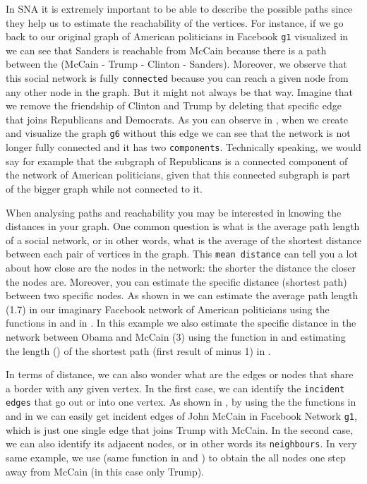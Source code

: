 In SNA it is extremely important to be able to describe the possible paths since they help us to estimate the reachability of the vertices. For instance, if we go back to our original graph of American politicians in Facebook \texttt{g1} visualized in  we can see that Sanders is reachable from McCain because there is a path between the (McCain - Trump - Clinton - Sanders).  Moreover, we observe that this social network is fully \texttt{connected} because you can reach a given node from any other node in the graph. But it might not always be that way. Imagine that we remove the friendship of Clinton and Trump by deleting that specific edge that joins Republicans and Democrats. As you can observe in , when we create and visualize the graph \texttt{g6} without this edge we can see that the network is not longer fully connected and it has two \texttt{components}. Technically speaking, we would say for example that the subgraph of Republicans is a connected component of the network of American politicians, given that this connected subgraph is part of the bigger graph while not connected to it.


When analysing paths and reachability you may be interested in knowing the distances in your graph. One common question is what is the average path length of a social network, or in other words, what is the average of the shortest distance between each pair of vertices in the graph. This \texttt{mean distance} can tell you a lot about how close are the nodes in the network: the shorter the distance the closer the nodes are. Moreover, you can estimate the specific distance (shortest path) between two specific nodes.  As shown in  we can estimate the average path length (1.7) in our imaginary Facebook network of American politicians using the functions  in  and  in . In this example we also estimate the specific distance in the network between Obama and McCain (3) using the function  in  and estimating the length () of the shortest path (first result of  minus 1) in .


In terms of distance, we can also wonder what are the edges or nodes that share a border with any given vertex. In the first case, we can identify the \texttt{incident edges} that go out or into one vertex. As shown in , by using the the functions  in  and  in  we can easily get incident edges of John McCain in Facebook Network \texttt{g1}, which is just one single edge that joins Trump with McCain. In the second case, we can also identify its adjacent nodes, or in other words its \texttt{neighbours}. In very same example, we use  (same function in  and ) to obtain the all nodes one step away from McCain (in this case only Trump).

